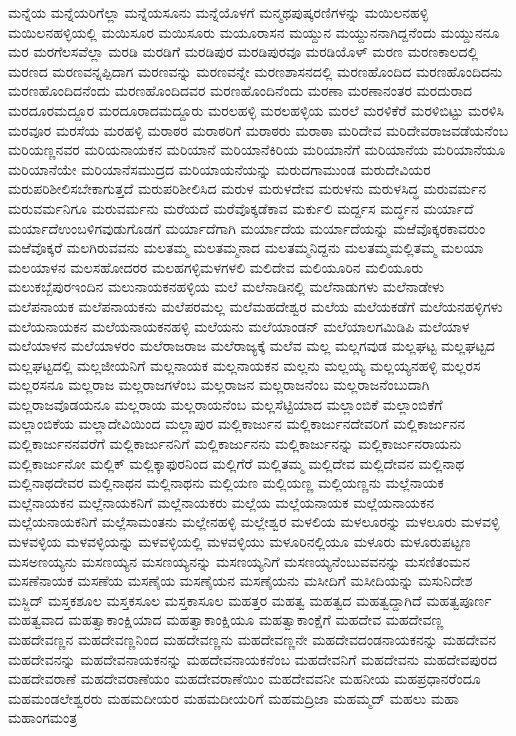 {ಮನ್ನೆಯ
ಮನ್ನೆಯರಿಗೆಲ್ಲಾ
ಮನ್ನೆಯಸೂನು
ಮನ್ನೆಯೊಳಗೆ
ಮನ್ಮಥಪುಷ್ಕರಣಿಗಳನ್ನು
ಮಯಿಲನಹಳ್ಳಿ
ಮಯಿಲನಹಳ್ಳಿಯಲ್ಲಿ
ಮಯಿಸೂರ
ಮಯಿಸೂರು
ಮಯೂರಾಸನ
ಮಯ್ದುನ
ಮಯ್ದುನನಾಗಿದ್ದನೆಂದು
ಮಯ್ದುನನೂ
ಮರ
ಮರಗೆಲಸವೆಲ್ಲಾ
ಮರಡಿ
ಮರಡಿಗೆ
ಮರಡಿಪುರ
ಮರಡಿಪುರವೂ
ಮರಡಿಯೊಳ್
ಮರಣ
ಮರಣಕಾಲದಲ್ಲಿ
ಮರಣದ
ಮರಣವನ್ನಪ್ಪಿದಾಗ
ಮರಣವನ್ನು
ಮರಣವನ್ನೇ
ಮರಣಶಾಸನದಲ್ಲಿ
ಮರಣಹೊಂದಿದ
ಮರಣಹೊಂದಿದನು
ಮರಣಹೊಂದಿದನೆಂದು
ಮರಣಹೊಂದಿದವರ
ಮರಣಹೊಂದಿನೆಂದು
ಮರಣಾ
ಮರಣಾನಂತರ
ಮರದುರಾದ
ಮರದೂರಮದ್ದೂರ
ಮರದೂರಾದಮದ್ದೂರು
ಮರಲಹಳ್ಳಿ
ಮರಲಹಳ್ಳಿಯ
ಮರಲೆ
ಮರಳಿಕೆರೆ
ಮರಳಿಬಿಟ್ಟು
ಮರಳಿಸಿ
ಮರವೂರ
ಮರಸೆಯ
ಮರಹಳ್ಳಿ
ಮರಾಠರ
ಮರಾಠರಿಗೆ
ಮರಾಠರು
ಮರಾಠಾ
ಮರಿದೇವ
ಮರಿದೇವರಾಜವಡೆಯನೆಂಬ
ಮರಿಯಣ್ಣನವರ
ಮರಿಯನಾಯಕನ
ಮರಿಯಾನೆ
ಮರಿಯಾನೆಕಿರಿಯ
ಮರಿಯಾನೆಗೆ
ಮರಿಯಾನೆಯ
ಮರಿಯಾನೆಯೂ
ಮರಿಯಾನೆಯೇ
ಮರಿಯಾನೆಸಮುದ್ರದ
ಮರಿಯಾಯನೆಯನ್ನು
ಮರುದಗಾಮುಂಡ
ಮರುದೇವಿಯರ
ಮರುಪರಿಶೀಲಿಸಬೇಕಾಗುತ್ತದೆ
ಮರುಪರಿಶೀಲಿಸಿದ
ಮರುಳ
ಮರುಳದೇವ
ಮರುಳನು
ಮರುಳಸಿದ್ಧ
ಮರುವರ್ಮನ
ಮರುವರ್ಮನಿಗೂ
ಮರುವರ್ಮನು
ಮರೆಯದೆ
ಮರೆವೊಕ್ಕಡೆಕಾವ
ಮರ್ಕುಲಿ
ಮರ್ದ್ದಸ
ಮರ್ದ್ಧನ
ಮರ್ಯಾದೆ
ಮರ್ಯಾದೆಉಂಬಳಿಗವುಡುಗೊಡಗೆ
ಮರ್ಯಾದೆಗಾಗಿ
ಮರ್ಯಾದೆಯ
ಮರ್ಯಾದೆಯನ್ನು
ಮಱೆವೊಕ್ಕರಕಾವರುಂ
ಮಱೆವೊಕ್ಕರೆ
ಮಲಗಿರುವವನು
ಮಲತಮ್ಮ
ಮಲತಮ್ಮನಾದ
ಮಲತಮ್ಮನಿದ್ದನು
ಮಲತಮ್ಮಮಲ್ಲಿತಮ್ಮ
ಮಲಯಾ
ಮಲಯಾಳನ
ಮಲಸಹೋದರರ
ಮಲಹಗಳ್ಳಿಮಳಗಳಲಿ
ಮಲಿದೇವ
ಮಲಿಯೂರಿನ
ಮಲಿಯೂರು
ಮಲುಕಬ್ಬೆಪುರಇಂದಿನ
ಮಲುನಾಯಕನಹಳ್ಳಿಯ
ಮಲೆ
ಮಲೆನಾಡಿನಲ್ಲಿ
ಮಲೆನಾಡುಗಳು
ಮಲೆನಾಡೇಳು
ಮಲೆಪನಾಯಕ
ಮಲೆಪನಾಯಕನು
ಮಲೆಪರಮಲ್ಲ
ಮಲೆಮಹದೇಶ್ವರ
ಮಲೆಯ
ಮಲೆಯಕಡೆಗೆ
ಮಲೆಯನಹಳ್ಳಿಗಳು
ಮಲೆಯನಾಯಕನ
ಮಲೆಯನಾಯಕನಹಳ್ಳಿ
ಮಲೆಯನು
ಮಲೆಯಾಂಡನ್
ಮಲೆಯಾಲಗಮಿಡಿಪಿ
ಮಲೆಯಾಳ
ಮಲೆಯಾಳನ
ಮಲೆಯಾಳರಂ
ಮಲೆರಾಜರಾಜ
ಮಲೆರಾಜ್ಯಕ್ಕೆ
ಮಲೆವ
ಮಲ್ಲ
ಮಲ್ಲಗವುಡ
ಮಲ್ಲಘಟ್ಟ
ಮಲ್ಲಘಟ್ಟದ
ಮಲ್ಲಘಟ್ಟದಲ್ಲಿ
ಮಲ್ಲಜೀಯನಿಗೆ
ಮಲ್ಲನಾಯಕ
ಮಲ್ಲನಾಯಕನ
ಮಲ್ಲನು
ಮಲ್ಲಯ್ಯ
ಮಲ್ಲಯ್ಯನಹಳ್ಳಿ
ಮಲ್ಲರಸ
ಮಲ್ಲರಸನೂ
ಮಲ್ಲರಾಜ
ಮಲ್ಲರಾಜಗಳೆಂಬ
ಮಲ್ಲರಾಜನ
ಮಲ್ಲರಾಜನೆಂಬ
ಮಲ್ಲರಾಜನೆಂಬುದಾಗಿ
ಮಲ್ಲರಾಜವೊಡಯನೂ
ಮಲ್ಲರಾಯ
ಮಲ್ಲರಾಯನೆಂಬ
ಮಲ್ಲಸೆಟ್ಟಿಯಾದ
ಮಲ್ಲಾಂಬಿಕೆ
ಮಲ್ಲಾಂಬಿಕೆಗೆ
ಮಲ್ಲಾಂಬಿಕೆಯ
ಮಲ್ಲಾದೇವಿಯಿಂದ
ಮಲ್ಲಾಪುರ
ಮಲ್ಲಿಕಾರ್ಜುನ
ಮಲ್ಲಿಕಾರ್ಜುನದೇವರಿಗೆ
ಮಲ್ಲಿಕಾರ್ಜುನನ
ಮಲ್ಲಿಕಾರ್ಜುನನವರೆಗೆ
ಮಲ್ಲಿಕಾರ್ಜುನನಿಗೆ
ಮಲ್ಲಿಕಾರ್ಜುನನು
ಮಲ್ಲಿಕಾರ್ಜುನನ್ನು
ಮಲ್ಲಿಕಾರ್ಜುನರಾಯನು
ಮಲ್ಲಿಕಾರ್ಜುನೋ
ಮಲ್ಲಿಕ್
ಮಲ್ಲಿಕ್ಕಾಫುರನಿಂದ
ಮಲ್ಲಿಗೆರೆ
ಮಲ್ಲಿತಮ್ಮ
ಮಲ್ಲಿದೇವ
ಮಲ್ಲಿದೇವನ
ಮಲ್ಲಿನಾಥ
ಮಲ್ಲಿನಾಥದೇವರ
ಮಲ್ಲಿನಾಥನ
ಮಲ್ಲಿನಾಥನು
ಮಲ್ಲಿಯಣ
ಮಲ್ಲಿಯಣ್ಣ
ಮಲ್ಲಿಯಣ್ಣನು
ಮಲ್ಲೆನಾಯಕ
ಮಲ್ಲೆನಾಯಕನ
ಮಲ್ಲೆನಾಯಕನಿಗೆ
ಮಲ್ಲೆನಾಯಕರು
ಮಲ್ಲೆಯ
ಮಲ್ಲೆಯನಾಯಕ
ಮಲ್ಲೆಯನಾಯಕನ
ಮಲ್ಲೆಯನಾಯಕನಿಗೆ
ಮಲ್ಲೆಸಾಮಂತನು
ಮಲ್ಲೇನಹಳ್ಳಿ
ಮಲ್ಲೇಶ್ವರ
ಮಳಲಿಯ
ಮಳಲೂರನ್ನು
ಮಳಲೂರು
ಮಳವಳ್ಳಿ
ಮಳವಳ್ಳಿಯ
ಮಳವಳ್ಳಿಯನ್ನು
ಮಳವಳ್ಳಿಯಲ್ಲಿ
ಮಳವಳ್ಳಿಯು
ಮಳೂರಿನಲ್ಲಿಯೂ
ಮಳೂರು
ಮಳೂರುಪಟ್ಟಣ
ಮಸಅಣಯ್ಯನು
ಮಸಣಯ್ಯನ
ಮಸಣಯ್ಯನನ್ನು
ಮಸಣಯ್ಯನಿಗೆ
ಮಸಣಯ್ಯನೆಂಬುವವನನ್ನು
ಮಸಣಿತಂಮನ
ಮಸಣೆನಾಯಕ
ಮಸಣೆಯ
ಮಸಣೈಯ
ಮಸಣೈಯನ
ಮಸಣೈಯನು
ಮಸೀದಿಗೆ
ಮಸೀದಿಯನ್ನು
ಮಸುನಿದೇಶ
ಮಸ್ಜಿದ್
ಮಸ್ತಕಶೂಲ
ಮಸ್ತಕಸೂಲ
ಮಸ್ತಕಾಸೂಲ
ಮಹತ್ತರ
ಮಹತ್ವ
ಮಹತ್ವದ
ಮಹತ್ವದ್ದಾಗಿದೆ
ಮಹತ್ವಪೂರ್ಣ
ಮಹತ್ವವಾದ
ಮಹತ್ವಾಕಾಂಕ್ಷಿಯಾದ
ಮಹತ್ವಾಕಾಂಕ್ಷಿಯೂ
ಮಹತ್ವಾಕಾಂಕ್ಷೆಗೆ
ಮಹದೇವ
ಮಹದೇವಣ್ಣ
ಮಹದೇವಣ್ಣನ
ಮಹದೇವಣ್ಣನಿಂದ
ಮಹದೇವಣ್ಣನು
ಮಹದೇವಣ್ಣನೇ
ಮಹದೇವದಂಡನಾಯಕನನ್ನು
ಮಹದೇವನ
ಮಹದೇವನನ್ನು
ಮಹದೇವನಾಯಕನನ್ನು
ಮಹದೇವನಾಯಕನೆಂಬ
ಮಹದೇವನಿಗೆ
ಮಹದೇವನು
ಮಹದೇವಪುರದ
ಮಹದೇವರಾಣೆ
ಮಹದೇವರಾಣೆಯಂ
ಮಹದೇವರಾಣೆಯಿಂ
ಮಹದೇವವನೀ
ಮಹನೀಯ
ಮಹಪ್ರಧಾನರೆಂದೂ
ಮಹಮಂಡಲೇಶ್ವರರು
ಮಹಮದೀಯರ
ಮಹಮದೀಯರಿಗೆ
ಮಹಮದ್ರಿಜಾ
ಮಹಮ್ಮದ್
ಮಹಲು
ಮಹಾ
ಮಹಾಂಗಮಂತ್ರ
}
